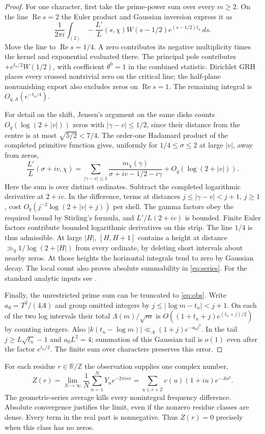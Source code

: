 \documentclass[11pt]{article}
\newcommand{\Z}{\mathbb Z}\newcommand{\R}{\mathbb R}
\newcommand{\re}{\operatorname{Re}}\newcommand{\im}{\operatorname{Im}}
\begin{document}
\begin{proof}
For one character, first take the prime-power sum over every $m\ge2$. On the line $\re s=2$ the Euler product and Gaussian inversion express it as
\[
 \frac1{2\pi i}\int_{(2)}
     -\frac{L'}{L}(s,\chi)W(s-1/2)e^{(s-1/2)t_n}\,ds .
\]
Move the line to $\re s=1/4$. A zero contributes its negative multiplicity times the kernel and exponential evaluated there. The principal pole contributes $+e^{t_n/2}W(1/2)$, with coefficient $\theta^0=1$ in the combined statistic. Dirichlet GRH places every crossed nontrivial zero on the critical line; the half-plane nonvanishing export also excludes zeros on $\re s=1$. The remaining integral is $O_{q,A}(e^{-t_n/4})$.

For detail on the shift, Jensen's argument on the same disks counts $O_q(\log(2+|v|))$ zeros with $|\gamma-v|\le1/2$, since their distance from the centre is at most $\sqrt{5/2}<7/4$. The order-one Hadamard product of the completed primitive function gives, uniformly for $1/4\le\sigma\le2$ at large $|v|$, away from zeros,
\[
 \frac{L'}{L}(\sigma+iv,\chi)=
 \sum_{|\gamma-v|\le1}\frac{m_\chi(\gamma)}{\sigma+iv-1/2-i\gamma}
 +O_q(\log(2+|v|)).
\]
Here the sum is over distinct ordinates. Subtract the completed logarithmic derivative at $2+iv$. In the difference, terms at distances $j\le|\gamma-v|<j+1$, $j\ge1$, cost $O_q(j^{-2}\log(2+|v|+j))$ per shell. The gamma factors obey the required bound by Stirling's formula, and $L'/L(2+iv)$ is bounded. Finite Euler factors contribute bounded logarithmic derivatives on this strip. The line $1/4$ is thus admissible. At large $|H|$, $[H,H+1]$ contains a height at distance $\gg_q 1/\log(2+|H|)$ from every ordinate, by deleting short intervals about nearby zeros. At those heights the horizontal integrals tend to zero by Gaussian decay. The local count also proves absolute summability in \eqref{eq:series}. For the standard analytic inputs see \cite{davenport,bmor}.

Finally, the unrestricted prime sum can be truncated to \eqref{eq:obs}. Write $a_0=T^2/(4A)$ and group omitted integers by $j\le|\log m-t_n|<j+1$. On each of the two log intervals their total $\Lambda(m)/\sqrt m$ is $O((1+t_n+j)e^{(t_n+j)/2})$ by counting integers. Also $|k(t_n-\log m)|\ll_A (1+j)e^{-a_0j^2}$. In the tail $j\ge L\sqrt{t_n}-1$ and $a_0L^2=4$; summation of this Gaussian tail is $o(1)$ even after the factor $e^{t_n/2}$. The finite sum over characters preserves this error.
\end{proof}
For each residue $r\in\R/\Z$ the observation supplies one complex number,
\begin{equation}
 Z(r)=\lim_{N\to\infty}\frac1N\sum_{n=1}^N Y_n e^{-2\pi i n r}
     =\sum_{u\in r+\Z} c(u)(1+iu)e^{-Au^2}.
 \label{eq:fold}
\end{equation}
The geometric-series average kills every nonintegral frequency difference. Absolute convergence justifies the limit, even if the nonzero residue classes are dense. Every term in the real part is nonnegative. Thus $Z(r)=0$ precisely when this class has no zeros.
\end{document}
